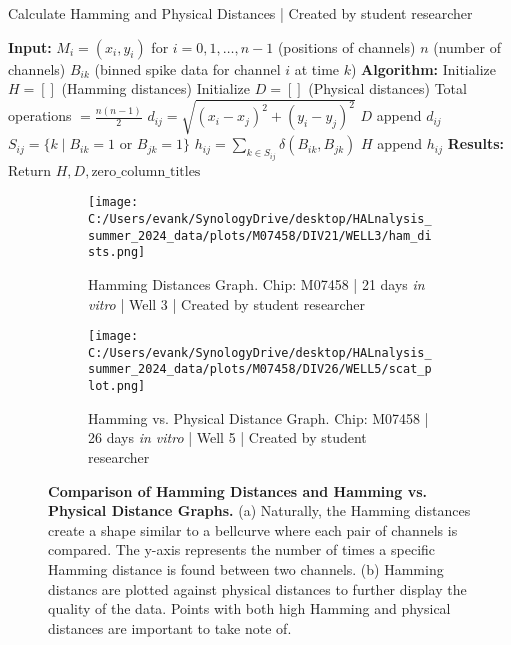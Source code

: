 \documentclass{article} %
\begin{document}
\begin{singlespace}
    \begin{algorithm}
    \caption{Calculate Hamming and Physical Distances | Created by student researcher}
        \begin{algorithmic}[1]
            \State \textbf{Input:}
            \State  $M_i = (x_i, y_i)$ for $i = 0, 1, \ldots, n-1$ (positions of channels)
            \State  $n$ (number of channels)
            \State  $B_{ik}$ (binned spike data for channel $i$ at time $k$)
            \State
            \State \textbf{Algorithm:}
            \State  Initialize $H = []$ (Hamming distances)
            \State  Initialize $D = []$ (Physical distances)
            \State  Total operations $= \frac{n(n-1)}{2}$
                    \State $d_{ij} = \sqrt{(x_i - x_j)^2 + (y_i - y_j)^2}$
                    \State $D$ append $d_{ij}$
                    \State $S_{ij} = \{k \mid B_{ik} = 1 \text{ or } B_{jk} = 1\}$
                    \State $h_{ij} = \sum_{k \in S_{ij}} \delta(B_{ik}, B_{jk})$
                    \State $H$ append $h_{ij}$
                \EndFor
            \EndFor
            \State
            \State \textbf{Results:}
            \State  Return $H, D, \text{zero\_column\_titles}$
        \end{algorithmic}
    \end{algorithm}
\end{singlespace}


\begin{figure}
    \centering
    \begin{subfigure}[b]{0.49\textwidth}
        \centering
        \texttt{[image: C:/Users/evank/SynologyDrive/desktop/HALnalysis\_summer\_2024\_data/plots/M07458/DIV21/WELL3/ham\_dists.png]}
        \caption{Hamming Distances Graph. Chip: M07458 | 21 days \textit{in vitro} | Well 3 | Created by student researcher}
    \end{subfigure}
    \hspace{\fill}
    \begin{subfigure}[b]{0.49\textwidth}
        \centering
        \texttt{[image: C:/Users/evank/SynologyDrive/desktop/HALnalysis\_summer\_2024\_data/plots/M07458/DIV26/WELL5/scat\_plot.png]}
        \caption{Hamming vs. Physical Distance Graph. Chip: M07458 | 26 days \textit{in vitro} | Well 5 | Created by student researcher}
    \end{subfigure}
    \caption{\textbf{Comparison of Hamming Distances and Hamming vs. Physical Distance Graphs.} (a) Naturally, the Hamming distances create a shape similar to a bellcurve where each pair of channels is compared. The y-axis represents the number of times a specific Hamming distance is found between two channels. (b) Hamming distancs are plotted against physical distances to further display the quality of the data. Points with both high Hamming and physical distances are important to take note of.}
\end{figure}
\end{document}
